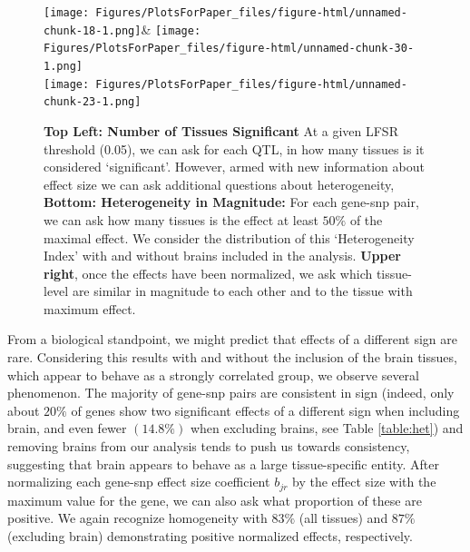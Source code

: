 \newline
\begin{figure}[htbp]
\texttt{[image: Figures/PlotsForPaper\_files/figure-html/unnamed-chunk-18-1.png]}&
\texttt{[image: Figures/PlotsForPaper\_files/figure-html/unnamed-chunk-30-1.png]}\\
\texttt{[image: Figures/PlotsForPaper\_files/figure-html/unnamed-chunk-23-1.png]}\\
\caption{\textbf{Top Left: Number of Tissues Significant} At a given LFSR threshold (0.05), we can ask for each QTL, in how many tissues is it considered `significant'. However, armed with new information about effect size we can ask additional questions about heterogeneity, \textbf{Bottom: Heterogeneity in Magnitude:} For each gene-snp pair, we can ask how many tissues is the effect at least $50\%$ of the maximal effect. We consider the distribution of this `Heterogeneity Index' with and without brains included in the analysis. \textbf{Upper right}, once the effects have been normalized, we ask which tissue-level are similar in magnitude to each other and to the tissue with maximum effect.}
\label{fig:het}
\end{figure}\newline

From a biological standpoint, we might predict that effects of a different sign are rare. Considering this results with and without the inclusion of the brain tissues, which appear to behave as a strongly correlated group, we observe several phenomenon. The majority of gene-snp pairs are consistent in sign (indeed, only about $20\%$ of genes show two significant effects of a different sign when including brain, and even fewer $(14.8\%)$ when excluding brains, see Table \ref{table:het}) and removing brains from our analysis tends to push us towards consistency, suggesting that brain appears to behave as a large tissue-specific entity. After normalizing each gene-snp effect size coefficient $b_{jr}$ by the effect size with the maximum value for the gene, we can also ask what proportion of these are positive. We again recognize homogeneity with $83\%$ (all tissues) and $87\%$  (excluding brain) demonstrating positive normalized effects, respectively. 



